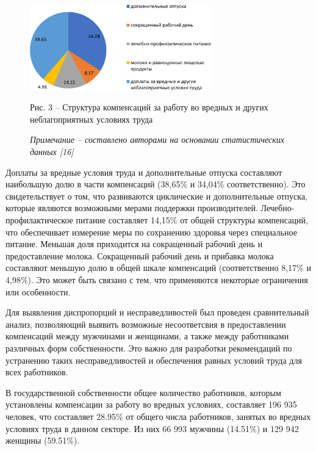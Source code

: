 \begin{figure}[H]
	\centering
	\includegraphics[width=0.7\textwidth]{assets/342.2}
	\caption*{Рис. 3 -- Структура компенсаций за работу во вредных и других неблагоприятных условиях труда}
	\caption*{\normalfont \emph{Примечание -- составлено авторами на основании статистических данных {[}16{]}}}
\end{figure}

\begin{multicols}{2}
Доплаты за вредные условия труда и дополнительные отпуска составляют
наибольшую долю в части компенсаций (38,65\% и 34,04\% соответственно).
Это свидетельствует о том, что развиваются циклические и дополнительные
отпуска, которые являются возможными мерами поддержки производителей.
Лечебно-профилактическое питание составляет 14,15\% от общей структуры
компенсаций, что обеспечивает измерение меры по сохранению здоровья
через специальное питание. Меньшая доля приходится на сокращенный
рабочий день и предоставление молока. Сокращенный рабочий день и
прибавка молока составляют меньшую долю в общей шкале компенсаций
(соответственно 8,17\% и 4,98\%). Это может быть связано с тем, что
применяются некоторые ограничения или особенности.

Для выявления диспропорций и несправедливостей был проведен
сравнительный анализ, позволяющий выявить возможные несоответсвия в
предоставлении компенсаций между мужчинами и женщинами, а также между
работниками различных форм собственности. Это важно для разработки
рекомендаций по устранению таких несправедливостей и обеспечения равных
условий труда для всех работников.

В государственной собственности общее количество работников, которым
установлены компенсации за работу во вредных условиях, составляет 196
935 человек, что составляет 28.95\% от общего числа работников, занятых
во вредных условиях труда в данном секторе. Из них 66 993 мужчины
(14.51\%) и 129 942 женщины (59.51\%).
\end{multicols}

